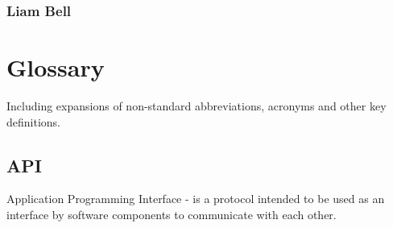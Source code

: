 \documentclass{l3proj}
\begin{document}
\subsection{Liam Bell}

\appendix

\chapter{Glossary}

Including expansions of non-standard abbreviations, acronyms and other key definitions.
\section{API}
Application Programming Interface - is a protocol intended to be used as an interface by software components to communicate with each other.



\end{document}
